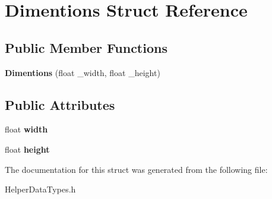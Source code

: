 \hypertarget{structDimentions}{}\section{Dimentions Struct Reference}
\label{structDimentions}
\subsection*{Public Member Functions}
\begin{DoxyCompactItemize}
\item 
\mbox{\label{structDimentions_a09f92ee6239282f5d76c77d87f46f93e}} 
{\bfseries Dimentions} (float \+\_\+width, float \+\_\+height)
\end{DoxyCompactItemize}
\subsection*{Public Attributes}
\begin{DoxyCompactItemize}
\item 
\mbox{\label{structDimentions_ab97c472cbe82f80e9a3a4f4c2ad9fe67}} 
float {\bfseries width}
\item 
\mbox{\label{structDimentions_a5481fb9860d7b293a20c720c027bae3a}} 
float {\bfseries height}
\end{DoxyCompactItemize}


The documentation for this struct was generated from the following file\+:\begin{DoxyCompactItemize}
\item 
Helper\+Data\+Types.\+h\end{DoxyCompactItemize}

